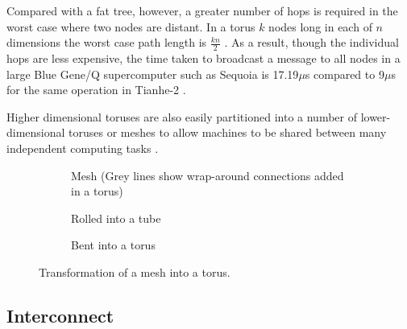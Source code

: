 				Compared with a fat tree, however, a greater number of hops is required
				in the worst case where two nodes are distant. In a torus $k$ nodes long
				in each of $n$ dimensions the worst case path length is $\frac{kn}{2}$
				\cite{dally04}. As a result, though the individual hops are less
				expensive, the time taken to broadcast a message to all nodes in a large
				Blue Gene/Q supercomputer such as Sequoia is 17.19$\mu$s compared to
				9$\mu$s for the same operation in Tianhe-2 \cite{morozov12}.
				
				Higher dimensional toruses are also easily partitioned into a number of
				lower-dimensional toruses or meshes to allow machines to be shared
				between many independent computing tasks \cite{yokokawa11,chen11}.
				
				\begin{figure}
					\begin{subfigure}[t]{\textwidth}
						\center
						
						\caption{Mesh (Grey lines show wrap-around connections added in a
						torus)}
						\label{fig:torus-flat}
					\end{subfigure}
					
					\vspace{1em}
					
					\begin{subfigure}[t]{\textwidth}
						\center
						
						\caption{Rolled into a tube}
						\label{fig:torus-pipe}
					\end{subfigure}
					
					\vspace{1em}
					
					\begin{subfigure}[t]{\textwidth}
						\center
						
						\caption{Bent into a torus}
						\label{fig:torus-3D}
					\end{subfigure}
					
					\caption{Transformation of a mesh into a torus.}
					\label{fig:forming-a-torus}
				\end{figure}
		
		\subsection{Interconnect}
			
			
